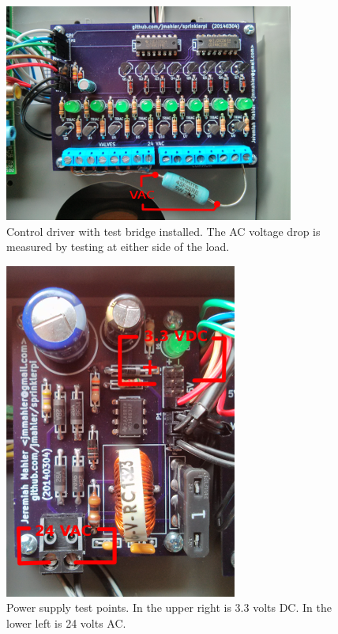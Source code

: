 \documentclass{article}
\begin{document}
\begin{enumerate}
\begin{figure}[hbp!]
\begin{center}
\includegraphics[scale=0.8]{img/contdrv-inst-03-load.png}
\end{center}
\caption{Control driver with test bridge installed.
The AC voltage drop is measured by testing at either side
of the load.}
\label{fig:contdrv-load}
\end{figure}

\begin{figure}[hbp!]
\begin{center}
\includegraphics[scale=0.5,angle=0]{img/power-inst-03.png}
\end{center}
\caption{Power supply test points. In the upper right is 3.3 volts DC.
In the lower left is 24 volts AC.}
\label{fig:ps-test}
\end{figure}


\end{enumerate}
\end{document}
